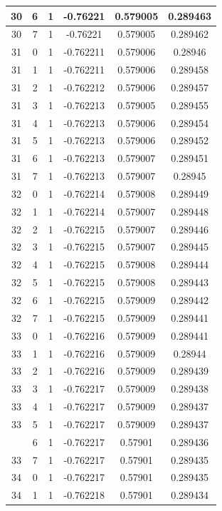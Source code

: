 \documentclass[12pt,a4paper]{article}
\numberwithin{equation}{section}
\numberwithin{figure}{section}
\numberwithin{table}{section}
\begin{document}
\begin{longtable}{|c|c|c|c|c|c|}
30 & 6 & 1 & -0.76221 & 0.579005 & 0.289463 \\ \hline
30 & 7 & 1 & -0.76221 & 0.579005 & 0.289462 \\ \hline
31 & 0 & 1 & -0.762211 & 0.579006 & 0.28946 \\ \hline
31 & 1 & 1 & -0.762211 & 0.579006 & 0.289458 \\ \hline
31 & 2 & 1 & -0.762212 & 0.579006 & 0.289457 \\ \hline
31 & 3 & 1 & -0.762213 & 0.579005 & 0.289455 \\ \hline
31 & 4 & 1 & -0.762213 & 0.579006 & 0.289454 \\ \hline
31 & 5 & 1 & -0.762213 & 0.579006 & 0.289452 \\ \hline
31 & 6 & 1 & -0.762213 & 0.579007 & 0.289451 \\ \hline
31 & 7 & 1 & -0.762213 & 0.579007 & 0.28945 \\ \hline
32 & 0 & 1 & -0.762214 & 0.579008 & 0.289449 \\ \hline
32 & 1 & 1 & -0.762214 & 0.579007 & 0.289448 \\ \hline
32 & 2 & 1 & -0.762215 & 0.579007 & 0.289446 \\ \hline
32 & 3 & 1 & -0.762215 & 0.579007 & 0.289445 \\ \hline
32 & 4 & 1 & -0.762215 & 0.579008 & 0.289444 \\ \hline
32 & 5 & 1 & -0.762215 & 0.579008 & 0.289443 \\ \hline
32 & 6 & 1 & -0.762215 & 0.579009 & 0.289442 \\ \hline
32 & 7 & 1 & -0.762215 & 0.579009 & 0.289441 \\ \hline
33 & 0 & 1 & -0.762216 & 0.579009 & 0.289441 \\ \hline
33 & 1 & 1 & -0.762216 & 0.579009 & 0.28944 \\ \hline
33 & 2 & 1 & -0.762216 & 0.579009 & 0.289439 \\ \hline
33 & 3 & 1 & -0.762217 & 0.579009 & 0.289438 \\ \hline
33 & 4 & 1 & -0.762217 & 0.579009 & 0.289437 \\ \hline
33 & 5 & 1 & -0.762217 & 0.579009 & 0.289437 \\ \hline
\pagebreak
33 & 6 & 1 & -0.762217 & 0.57901 & 0.289436 \\ \hline
33 & 7 & 1 & -0.762217 & 0.57901 & 0.289435 \\ \hline
34 & 0 & 1 & -0.762217 & 0.57901 & 0.289435 \\ \hline
34 & 1 & 1 & -0.762218 & 0.57901 & 0.289434 \\ \hline

\end{longtable}
\end{document}
